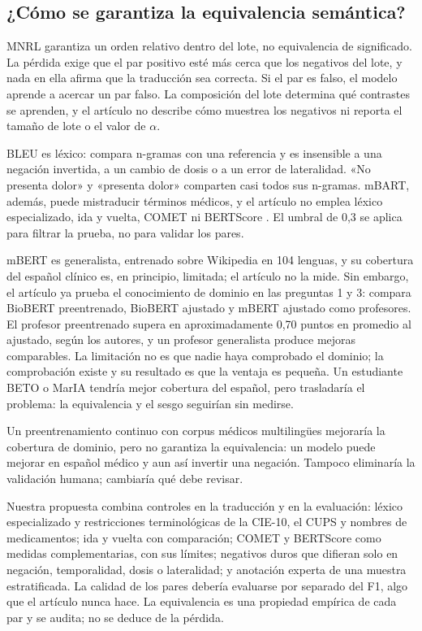 \subsection{¿Cómo se garantiza la equivalencia semántica?}

MNRL garantiza un orden relativo dentro del lote, no equivalencia de significado. La pérdida exige que el par positivo esté más cerca que los negativos del lote, y nada en ella afirma que la traducción sea correcta. Si el par es falso, el modelo aprende a acercar un par falso. La composición del lote determina qué contrastes se aprenden, y el artículo no describe cómo muestrea los negativos ni reporta el tamaño de lote o el valor de $\alpha$.

BLEU es léxico: compara n-gramas con una referencia y es insensible a una negación invertida, a un cambio de dosis o a un error de lateralidad. «No presenta dolor» y «presenta dolor» comparten casi todos sus n-gramas. mBART, además, puede mistraducir términos médicos, y el artículo no emplea léxico especializado, ida y vuelta, COMET \cite{rei2020} ni BERTScore \cite{zhang2020}. El umbral de 0,3 se aplica para filtrar la prueba, no para validar los pares.

mBERT \cite{devlin2019} es generalista, entrenado sobre Wikipedia en 104 lenguas, y su cobertura del español clínico es, en principio, limitada; el artículo no la mide. Sin embargo, el artículo ya prueba el conocimiento de dominio en las preguntas 1 y 3: compara BioBERT preentrenado, BioBERT ajustado y mBERT ajustado como profesores. El profesor preentrenado supera en aproximadamente 0,70 puntos en promedio al ajustado, según los autores, y un profesor generalista produce mejoras comparables. La limitación no es que nadie haya comprobado el dominio; la comprobación existe y su resultado es que la ventaja es pequeña. Un estudiante BETO \cite{canete2020} o MarIA \cite{gutierrez2022} tendría mejor cobertura del español, pero trasladaría el problema: la equivalencia y el sesgo seguirían sin medirse.

Un preentrenamiento continuo con corpus médicos multilingües mejoraría la cobertura de dominio, pero no garantiza la equivalencia: un modelo puede mejorar en español médico y aun así invertir una negación. Tampoco eliminaría la validación humana; cambiaría qué debe revisar.

Nuestra propuesta combina controles en la traducción y en la evaluación: léxico especializado y restricciones terminológicas de la CIE-10, el CUPS y nombres de medicamentos; ida y vuelta con comparación; COMET y BERTScore como medidas complementarias, con sus límites; negativos duros que difieran solo en negación, temporalidad, dosis o lateralidad; y anotación experta de una muestra estratificada. La calidad de los pares debería evaluarse por separado del F1, algo que el artículo nunca hace. La equivalencia es una propiedad empírica de cada par y se audita; no se deduce de la pérdida.
